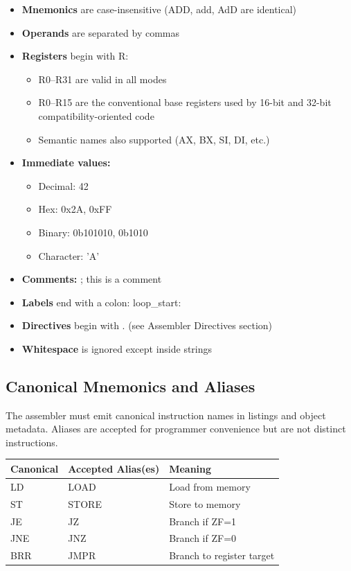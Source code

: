 \documentclass[11pt]{article}
\begin{document}
\begin{itemize}
    \item \textbf{Mnemonics} are case-insensitive (ADD, add, AdD are identical)
    \item \textbf{Operands} are separated by commas
    \item \textbf{Registers} begin with R:
    \begin{itemize}
        \item R0--R31 are valid in all modes
        \item R0--R15 are the conventional base registers used by 16-bit and 32-bit compatibility-oriented code
        \item Semantic names also supported (AX, BX, SI, DI, etc.)
    \end{itemize}
    \item \textbf{Immediate values:}
    \begin{itemize}
        \item Decimal: 42
        \item Hex: 0x2A, 0xFF
        \item Binary: 0b101010, 0b1010
        \item Character: 'A'
    \end{itemize}
    \item \textbf{Comments:} ; this is a comment
    \item \textbf{Labels} end with a colon: loop\_start:
    \item \textbf{Directives} begin with . (see Assembler Directives section)
    \item \textbf{Whitespace} is ignored except inside strings
\end{itemize}

\subsection{Canonical Mnemonics and Aliases}

The assembler must emit canonical instruction names in listings and object metadata. Aliases are accepted for programmer convenience but are not distinct instructions.

\begin{table}[h]
\centering
\begin{tabular}{@{}lll@{}}
\toprule
\textbf{Canonical} & \textbf{Accepted Alias(es)} & \textbf{Meaning} \\ \midrule
LD & LOAD & Load from memory \\
ST & STORE & Store to memory \\
JE & JZ & Branch if ZF=1 \\
JNE & JNZ & Branch if ZF=0 \\
BRR & JMPR & Branch to register target \\ \bottomrule
\end{tabular}
\end{table}
\end{document}
